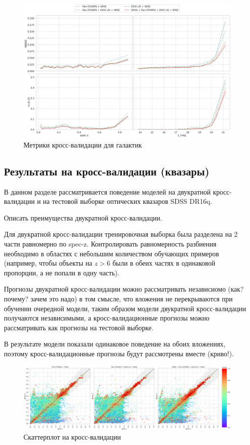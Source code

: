 \documentclass[fleqn,usenatbib]{mnras}
\begin{document}
\begin{figure}
    \centering
    \includegraphics[width=0.9\linewidth]{images/metrics-cv2-gal.png}
    \caption{Метрики кросс-валидации для галактик}
    \label{fig:metrics-cv2-gal}
\end{figure}

\subsection{Результаты на кросс-валидации (квазары)}
В данном разделе рассматривается поведение моделей на двукратной кросс-валидации и на тестовой выборке оптических квазаров SDSS DR16q.

Описать преимущества двукратной кросс-валидации.

Для двукратной кросс-валидации тренировочная выборка была разделена на 2 части равномерно по spec-z. Контролировать равномерность разбиения необходимо в областях с небольшим количеством обучающих примеров (например, чтобы объекты на $z > 6$ были в обеих частях в одинаковой пропорции, а не попали в одну часть).

Прогнозы двукратной кросс-валидации можно рассматривать независиомо (как? почему? зачем это надо) в том смысле, что вложения не перекрываются при обучении очередной модели, таким образом модели двукратной кросс-валидации получаются независимыми, а кросс-валидационные прогнозы можно рассматривать как прогнозы на тестовой выборке.

В результате модели показали одинаковое поведение на обоих вложениях, поэтому кросс-валидационные прогнозы будут рассмотрены вместе (криво!).

\begin{figure}
    \centering
    \includegraphics[width=0.9\linewidth]{images/scatterplots-cv2-qso.png}
    \caption{Скаттерплот на кросс-валидации}
    \label{fig:my_label}
\end{figure}
\end{document}
